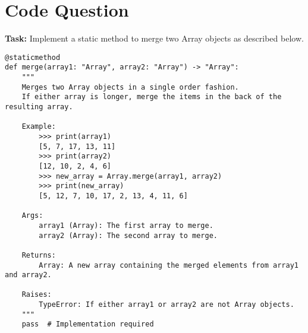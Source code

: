 \documentclass{article}
\begin{document}
\section{Code Question}

\textbf{Task:} Implement a static method to merge two Array objects as described below.

\begin{lstlisting}[caption={Merge two Array objects}, label={lst:merge_arrays}]
@staticmethod
def merge(array1: "Array", array2: "Array") -> "Array":
    """
    Merges two Array objects in a single order fashion. 
    If either array is longer, merge the items in the back of the resulting array.

    Example:
        >>> print(array1)
        [5, 7, 17, 13, 11]
        >>> print(array2)
        [12, 10, 2, 4, 6]
        >>> new_array = Array.merge(array1, array2)
        >>> print(new_array)
        [5, 12, 7, 10, 17, 2, 13, 4, 11, 6]

    Args:
        array1 (Array): The first array to merge.
        array2 (Array): The second array to merge.

    Returns:
        Array: A new array containing the merged elements from array1 and array2.

    Raises:
        TypeError: If either array1 or array2 are not Array objects.
    """
    pass  # Implementation required
\end{lstlisting}
\end{document}
